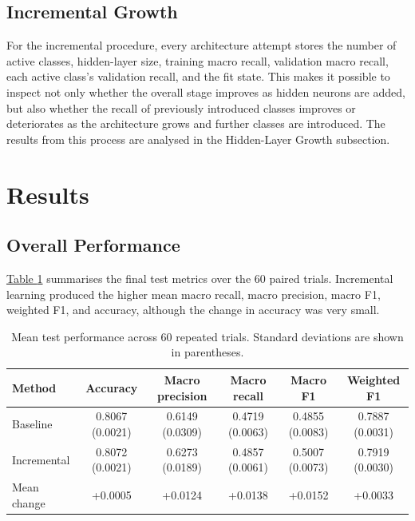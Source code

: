 \documentclass[conference]{IEEEtran}
\begin{document}
\subsection{Incremental Growth}

For the incremental procedure, every architecture attempt stores the number of active classes, hidden-layer size, training macro recall, validation macro recall, each active class's validation recall, and the fit state. This makes it possible to inspect not only whether the overall stage improves as hidden neurons are added, but also whether the recall of previously introduced classes improves or deteriorates as the architecture grows and further classes are introduced. The results from this process are analysed in the Hidden-Layer Growth subsection.

\section{Results}

\subsection{Overall Performance}

\hyperref[tab:overall_results]{Table \ref*{tab:overall_results}} summarises the final test metrics over the 60 paired trials. Incremental learning produced the higher mean macro recall, macro precision, macro F1, weighted F1, and accuracy, although the change in accuracy was very small.

\begin{table}[!t]
    \centering
    \caption{Mean test performance across 60 repeated trials. Standard deviations are shown in parentheses.}
    \label{tab:overall_results}
    \scriptsize
    \begin{tabular}{lccccc}
        \toprule
        Method & Accuracy & Macro precision & Macro recall & Macro F1 & Weighted F1 \\
        \midrule
        Baseline &
        0.8067 (0.0021) &
        0.6149 (0.0309) &
        0.4719 (0.0063) &
        0.4855 (0.0083) &
        0.7887 (0.0031) \\
        Incremental &
        0.8072 (0.0021) &
        0.6273 (0.0189) &
        0.4857 (0.0061) &
        0.5007 (0.0073) &
        0.7919 (0.0030) \\
        \midrule
        Mean change &
        +0.0005 &
        +0.0124 &
        +0.0138 &
        +0.0152 &
        +0.0033 \\
        \bottomrule
    \end{tabular}
\end{table}
\end{document}
